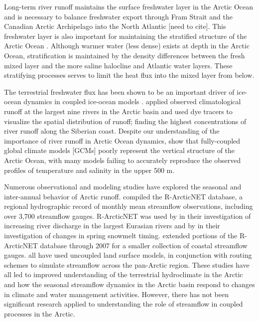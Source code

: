 \documentclass[jgrga, draft]{agutex}
\begin{document}
\begin{article}
Long-term river runoff maintains the surface freshwater layer in the Arctic Ocean and is necessary to balance freshwater export through Fram Strait and the Canadian Arctic Archipelago into the North Atlantic [need to cite].
This freshwater layer is also important for maintaining the stratified structure of the Arctic Ocean \citep{Nummelin_2015}.
Although warmer water (less dense) exists at depth in the Arctic Ocean, stratification is maintained by the density differences between the fresh mixed layer and the more saline halocline and Atlantic water layers.
These stratifying processes serves to limit the heat flux into the mixed layer from below.

The terrestrial freshwater flux has been shown to be an important driver of ice-ocean dynamics in coupled ice-ocean models \citep[e.g.][]{Lique_2015}.
\citet{Newton_2008} applied observed climatological runoff at the largest nine rivers in the Arctic basin and used dye tracers to visualize the spatial distribution of runoff; finding the highest concentrations of river runoff along the Siberian coast.
Despite our understanding of the importance of river runoff in Arctic Ocean dynamics, \citet{Nummelin_2015} show that fully-coupled global climate models [GCMs] poorly represent the vertical structure of the Arctic Ocean, with many models failing to accurately reproduce the observed profiles of temperature and salinity in the upper 500 m.

Numerous observational and modeling studies have explored the seasonal and inter-annual behavior of Arctic runoff.
\citet{Lammers_2001} compiled the R-ArcticNET database, a regional hydrographic record of monthly mean streamflow observations, including over 3,700 streamflow gauges.
R-ArcticNET was used by \citet{Shiklomanov_2009} in their investigation of increasing river discharge in the largest Eurasian rivers and by \citep{Tan_2011} in their investigation of changes in spring snowmelt timing.
\citet{Dai_2009} extended portions of the R-ArcticNET database through 2007 for a smaller collection of coastal streamflow gauges.
\citet{Adam_2007, Adam_2008, Su_2005, Dai_2009} all have used uncoupled land surface models, in conjunction with routing schemes to simulate streamflow across the pan-Arctic region.
These studies have all led to improved understanding of the terrestrial hydroclimate in the Arctic and how the seasonal streamflow dynamics in the Arctic basin respond to changes in climate and water management activities.
However, there has not been significant research applied to understanding the role of streamflow in coupled processes in the Arctic.


\end{article}
\end{document}
